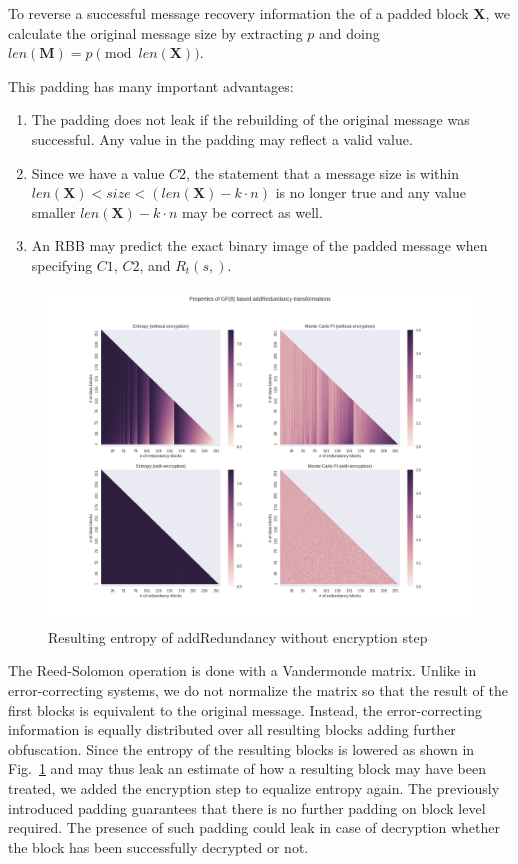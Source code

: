 \documentclass[10pt,journal,compsoc,twocolumn,twoside]{IEEEtran}
\let\MYoriglatexcaption\caption
\renewcommand{\caption}[2][\relax]{\MYoriglatexcaption[#2]{#2}}
\begin{document}
To reverse a successful message recovery information the of a padded block $\mathbf{X}$, we calculate the original message size by extracting $p$ and doing $len(\mathbf{M})=p \pmod{ len(\mathbf{X})}$.

This padding has many important advantages:
\begin{enumerate}
	\item The padding does not leak if the rebuilding of the original message was successful. Any value in the padding may reflect a valid value.
	\item Since we have a value $C2$, the statement that a message size is within $len(\mathbf{X})<size<(len(\mathbf{X})-k\cdot n)$ is no longer true and any value smaller $len(\mathbf{X})-k\cdot n$ may be correct as well.
	\item An RBB may predict the exact binary image of the padded message when specifying $C1$, $C2$, and $R_{t}(s,)$.
\end{enumerate}

\begin{figure}[ht]\centering
	\includegraphics[width=1\columnwidth]{randomblock_10kb}
	\caption{Resulting entropy of addRedundancy without encryption step}
	\label{fig:entropy}
\end{figure}


The Reed-Solomon operation is done with a Vandermonde matrix. Unlike in error-correcting systems, we do not normalize the matrix so that the result of the first blocks is equivalent to the original message. Instead, the error-correcting information is equally distributed over all resulting blocks adding further obfuscation. Since the entropy of the resulting blocks is lowered as shown in Fig.~\ref{fig:entropy} and may thus leak an estimate of how a resulting block may have been treated, we added the encryption step to equalize entropy again. The previously introduced padding guarantees that there is no further padding on block level required. The presence of such padding could leak in case of decryption whether the block has been successfully decrypted or not.
\end{document}
